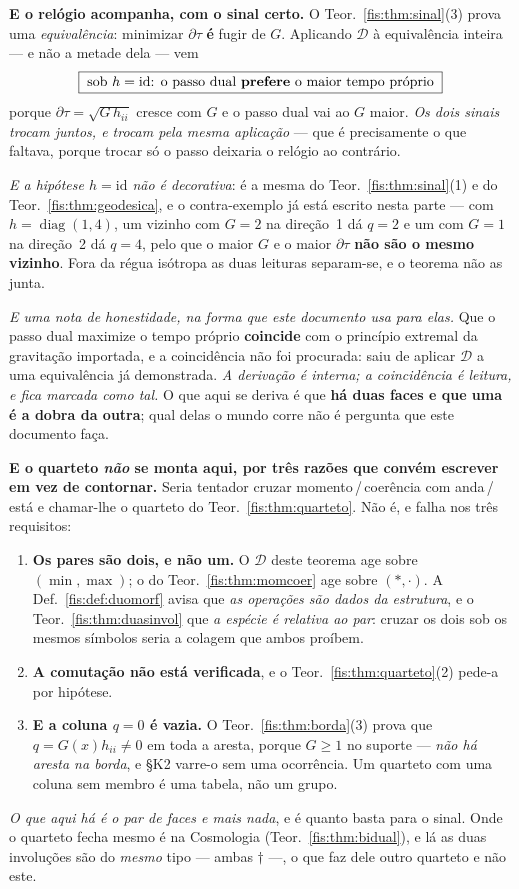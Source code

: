 \documentclass[livro.tex]{subfiles}
\begin{document}
\medskip\noindent\textbf{E o relógio acompanha, com o sinal certo.} O
Teor.~\ref{fis:thm:sinal}(3) prova uma \emph{equivalência}: minimizar
$\partial\tau$ \textbf{é} fugir de $G$. Aplicando $\mathcal{D}$ à equivalência
inteira --- e não a metade dela --- vem
\[
\boxed{\;\text{sob }h=\mathrm{id}\text{: o passo dual \textbf{prefere} o maior tempo próprio}\;}
\]
porque $\partial\tau=\sqrt{G\,h_{ii}}$ cresce com $G$ e o passo dual vai ao $G$
maior. \emph{Os dois sinais trocam juntos, e trocam pela mesma aplicação} --- que
é precisamente o que faltava, porque trocar só o passo deixaria o relógio ao
contrário.

\smallskip\noindent\emph{E a hipótese $h=\mathrm{id}$ não é decorativa}: é a
mesma do Teor.~\ref{fis:thm:sinal}(1) e do Teor.~\ref{fis:thm:geodesica}, e o
contra-exemplo já está escrito nesta parte --- com $h=\operatorname{diag}(1,4)$,
um vizinho com $G=2$ na direção~1 dá $q=2$ e um com $G=1$ na direção~2 dá $q=4$,
pelo que o maior $G$ e o maior $\partial\tau$ \textbf{não são o mesmo vizinho}.
Fora da régua isótropa as duas leituras separam-se, e o teorema não as junta.

\medskip\noindent\emph{E uma nota de honestidade, na forma que este documento usa
para elas.} Que o passo dual maximize o tempo próprio \textbf{coincide} com o
princípio extremal da gravitação importada, e a coincidência não foi procurada:
saiu de aplicar $\mathcal{D}$ a uma equivalência já demonstrada. \emph{A
derivação é interna; a coincidência é leitura, e fica marcada como tal.} O que
aqui se deriva é que \textbf{há duas faces e que uma é a dobra da outra}; qual
delas o mundo corre não é pergunta que este documento faça.

\medskip\noindent\textbf{E o quarteto \emph{não} se monta aqui, por três razões
que convém escrever em vez de contornar.} Seria tentador cruzar
momento\,/\,coerência com anda\,/\,está e chamar-lhe o quarteto do
Teor.~\ref{fis:thm:quarteto}. Não é, e falha nos três requisitos:
\begin{enumerate}\itemsep3pt
\item[(i)] \textbf{Os pares são dois, e não um.} O $\mathcal{D}$ deste teorema
age sobre $(\min,\max)$; o do Teor.~\ref{fis:thm:momcoer} age sobre
$(\ast,\cdot)$. A Def.~\ref{fis:def:duomorf} avisa que \emph{as operações são
dados da estrutura}, e o Teor.~\ref{fis:thm:duasinvol} que \emph{a espécie é
relativa ao par}: cruzar os dois sob os mesmos símbolos seria a colagem que
ambos proíbem.
\item[(ii)] \textbf{A comutação não está verificada}, e o
Teor.~\ref{fis:thm:quarteto}(2) pede-a por hipótese.
\item[(iii)] \textbf{E a coluna $q=0$ é vazia.} O Teor.~\ref{fis:thm:borda}(3)
prova que $q=G(x)h_{ii}\neq0$ em toda a aresta, porque $G\ge1$ no suporte ---
\emph{não há aresta na borda}, e §K2 varre-o sem uma ocorrência. Um quarteto com
uma coluna sem membro é uma tabela, não um grupo.
\end{enumerate}
\emph{O que aqui há é o par de faces e mais nada}, e é quanto basta para o
sinal. Onde o quarteto fecha mesmo é na Cosmologia
(Teor.~\ref{fis:thm:bidual}), e lá as duas involuções são do \emph{mesmo} tipo
--- ambas $\dagger$ ---, o que faz dele outro quarteto e não este.
\end{document}
